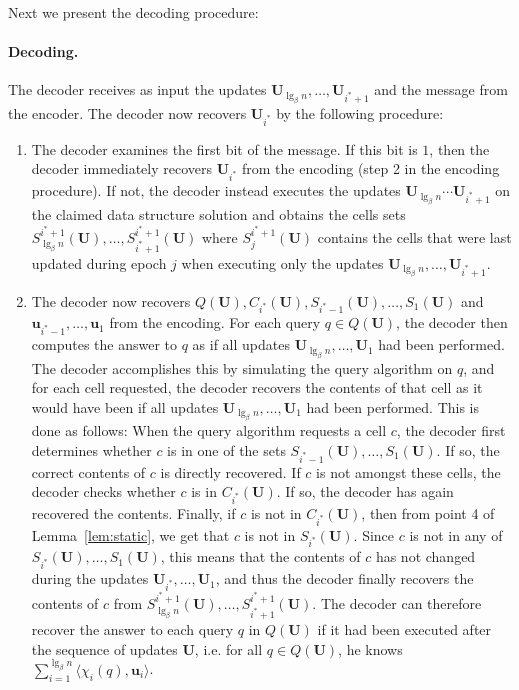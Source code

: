 \documentclass[letterpaper]{article}
\newcommand{\is}{{i^*}}
\newcommand{\uv}{\textbf{u}}
\newcommand{\U}{\textbf{U}}
\newcommand{\inc}[1]{\chi_{#1}}
\begin{document}
Next we present the decoding procedure:

\paragraph{Decoding.} The decoder receives as input the updates $\U_{\lg_\beta n},\dots,\U_{\is+1}$ and the message from the encoder. The decoder now recovers $\U_\is$  by the following procedure:

\begin{enumerate}
\item The decoder examines the first bit of the message. If this bit
  is $1$, then the decoder immediately recovers $\U_\is$ from the
  encoding (step 2 in the encoding procedure). If not, the decoder
  instead executes the updates $\U_{\lg_\beta n} \cdots \U_{\is+1}$ on
  the claimed data structure solution and obtains the cells sets
  $S_{\lg_\beta n}^{\is+1}(\U),\dots,S_{\is+1}^{\is+1}(\U)$ where
  $S_j^{\is+1}(\U)$ contains the cells that were last updated during
  epoch $j$ when executing only the updates $\U_{\lg_\beta n}, \dots,
  \U_{\is+1}$.

\item The decoder now recovers
  $Q(\U),C_\is(\U),S_{\is-1}(\U),\dots,S_1(\U)$ and $\uv_{\is-1},
  \dots, \uv_1$ from the encoding. For each query $q \in Q(\U)$, the
  decoder then computes the answer to $q$ as if all updates
  $\U_{\lg_\beta n},\dots, \U_1$ had been performed. The decoder
  accomplishes this by simulating the query algorithm on $q$, and for
  each cell requested, the decoder recovers the contents of that cell
  as it would have been if all updates $\U_{\lg_\beta n},\dots, \U_1$
  had been performed. This is done as follows: When the query
  algorithm requests a cell $c$, the decoder first determines whether
  $c$ is in one of the sets $S_{\is-1}(\U),\dots,S_1(\U)$. If so, the
  correct contents of $c$ is directly recovered. If $c$ is not amongst
  these cells, the decoder checks whether $c$ is in $C_\is(\U)$. If
  so, the decoder has again recovered the contents. Finally, if $c$ is
  not in $C_\is(\U)$, then from point 4 of Lemma~\ref{lem:static}, we
  get that $c$ is not in $S_\is(\U)$. Since $c$ is not in any of
  $S_\is(\U),\dots,S_1(\U)$, this means that the contents of $c$ has
  not changed during the updates $\U_\is, \dots, \U_1$, and thus the
  decoder finally recovers the contents of $c$ from $S_{\lg_\beta
    n}^{\is+1}(\U),\dots,S_{\is+1}^{\is+1}(\U)$. The decoder can
  therefore recover the answer to each query $q$ in $Q(\U)$ if it had
  been executed after the sequence of updates $\U$, i.e. for all $q
  \in Q(\U)$, he knows $\sum_{i=1}^{\lg_\beta n} \langle \inc{i}(q) ,
  \uv_i \rangle$.


\end{enumerate}
\end{document}
